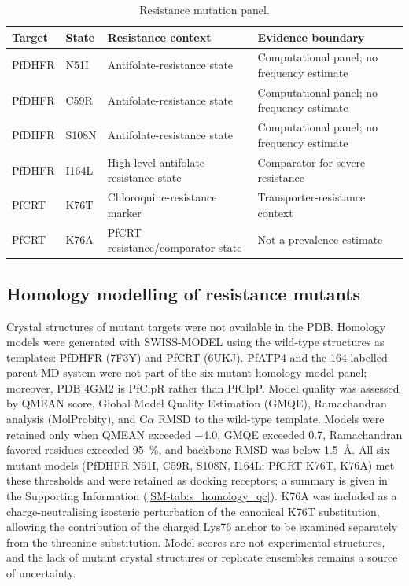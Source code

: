 \documentclass[journal=jcisd8,manuscript=article,layout=traditional]{achemso}
\begin{document}
\begin{table}[ht!]
\centering
\caption{Resistance mutation panel.}
\label{tab:mutations}
\begin{tabularx}{\textwidth}{l l l X}
\toprule
Target & State & Resistance context & Evidence boundary \\
\midrule
PfDHFR & N51I & Antifolate-resistance state & Computational panel; no frequency estimate \\
PfDHFR & C59R & Antifolate-resistance state & Computational panel; no frequency estimate \\
PfDHFR & S108N & Antifolate-resistance state & Computational panel; no frequency estimate \\
PfDHFR & I164L & High-level antifolate-resistance state & Comparator for severe resistance \\
PfCRT & K76T & Chloroquine-resistance marker & Transporter-resistance context \\
PfCRT & K76A & PfCRT resistance/comparator state & Not a prevalence estimate \\
\bottomrule
\end{tabularx}
\end{table}

\subsection{Homology modelling of resistance mutants}

Crystal structures of mutant targets were not available in the PDB. Homology models were generated with SWISS-MODEL using the wild-type structures as templates: PfDHFR (7F3Y) and PfCRT (6UKJ). PfATP4 and the 164-labelled parent-MD system were not part of the six-mutant homology-model panel; moreover, PDB 4GM2 is PfClpR rather than PfClpP. Model quality was assessed by QMEAN score, Global Model Quality Estimation (GMQE), Ramachandran analysis (MolProbity), and C$\alpha$ RMSD to the wild-type template. Models were retained only when QMEAN exceeded \num{-4.0}, GMQE exceeded \num{0.7}, Ramachandran favored residues exceeded \qty{95}{\percent}, and backbone RMSD was below \qty{1.5}{\angstrom}. All six mutant models (PfDHFR N51I, C59R, S108N, I164L; PfCRT K76T, K76A) met these thresholds and were retained as docking receptors; a summary is given in the Supporting Information (\cref{SM-tab:s_homology_qc}). K76A was included as a charge-neutralising isosteric perturbation of the canonical K76T substitution, allowing the contribution of the charged Lys76 anchor to be examined separately from the threonine substitution. Model scores are not experimental structures, and the lack of mutant crystal structures or replicate ensembles remains a source of uncertainty.
\end{document}
